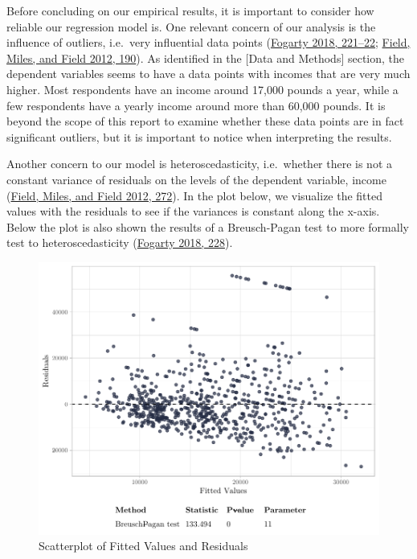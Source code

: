 \documentclass[
]{article}
\begin{document}
Before concluding on our empirical results, it is important to consider
how reliable our regression model is. One relevant concern of our
analysis is the influence of outliers, i.e.~very influential data points
(\protect\hyperlink{ref-fogarty2018quantitative}{Fogarty 2018, 221--22};
\protect\hyperlink{ref-field2012discovering}{Field, Miles, and Field
2012, 190}). As identified in the {[}Data and Methods{]} section, the
dependent variables seems to have a data points with incomes that are
very much higher. Most respondents have an income around 17,000 pounds a
year, while a few respondents have a yearly income around more than
60,000 pounds. It is beyond the scope of this report to examine whether
these data points are in fact significant outliers, but it is important
to notice when interpreting the results.

Another concern to our model is heteroscedasticity, i.e.~whether there
is not a constant variance of residuals on the levels of the dependent
variable, income (\protect\hyperlink{ref-field2012discovering}{Field,
Miles, and Field 2012, 272}). In the plot below, we visualize the fitted
values with the residuals to see if the variances is constant along the
x-axis. Below the plot is also shown the results of a Breusch-Pagan test
to more formally test to heteroscedasticity
(\protect\hyperlink{ref-fogarty2018quantitative}{Fogarty 2018, 228}).

\begin{figure}[H]

{\centering \includegraphics[width=0.8\linewidth]{paper_files/figure-latex/unnamed-chunk-4-1} 

}

\caption{Scatterplot of Fitted Values and Residuals}\label{fig:unnamed-chunk-4}
\end{figure}
\end{document}

